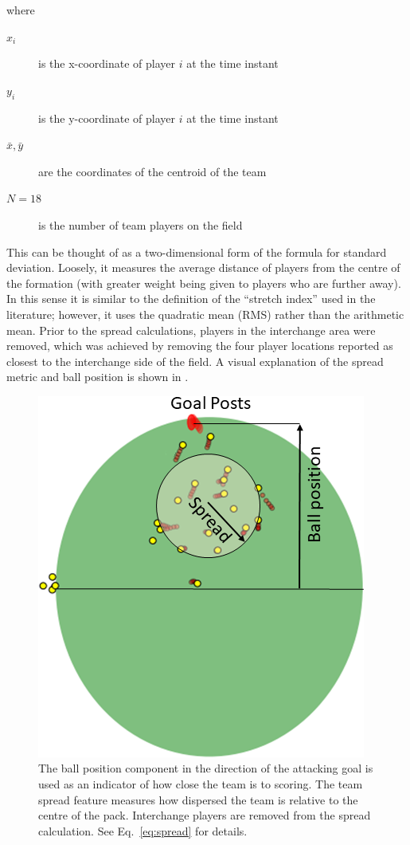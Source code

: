 \begin{minipage}{\textwidth}
where
\begin{description}
\item[$x_i$] is the x-coordinate of player $i$ at the time instant
\item[$y_i$] is the y-coordinate of player $i$ at the time instant
\item[$\bar{x}, \bar{y}$] are the coordinates of the centroid of the team
\item[$N=18$] is the number of team players on the field
\end{description}
\end{minipage}

This can be thought of as a two-dimensional form of the formula for standard deviation. Loosely, it measures the average distance of players from the centre of the formation (with greater weight being given to players who are further away). In this sense it is similar to the definition of the ``stretch index'' \cite{Yue2008, Bourbousson2010b} used in the literature; however, it uses the quadratic mean (RMS) rather than the arithmetic mean. Prior to the spread calculations, players in the interchange area were removed, which was achieved by removing the four player locations reported as closest to the interchange side of the field. A visual explanation of the spread metric and ball position is shown in .

\begin{figure}[!htb]
\centering
\includegraphics[width=0.5\linewidth]{figs/paper/gps_presentation_spread-metric.png}
\caption{The ball position component in the direction of the attacking goal is used as an indicator of how close the team is to scoring. The team spread feature measures how dispersed the team is relative to the centre of the pack. Interchange players are removed from the spread calculation. See Eq.~\ref{eq:spread} for details.}
\label{fig:spread-metric-concept}
\end{figure}

